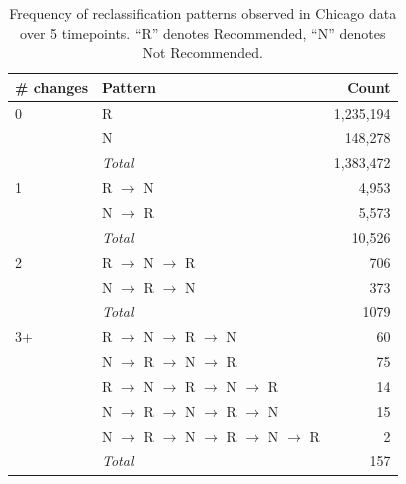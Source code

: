 
\begin{table}[t]
    \centering
    \caption{Frequency of reclassification patterns observed in Chicago data over 5 timepoints. ``R'' denotes Recommended, ``N'' denotes Not Recommended.}
    \label{tab:reclassification_patterns}
    \begin{tabular}{llr}
    \# changes & Pattern & Count \\
	 \hline
	 0 & R & 1,235,194\\
	 & N & 148,278\\
	 & \textit{Total} & 1,383,472 \\
	 \hline
	 1& R $\to$ N & 4,953\\
	 & N $\to$ R & 5,573\\
	 & \textit{Total} & 10,526\\
	 \hline
	 2& R $\to$ N $\to$ R & 706\\
	 & N $\to$ R $\to$ N & 373\\
	 & \textit{Total} & 1079\\
	 \hline
	 3+ & R $\to$ N $\to$ R $\to$ N & 60\\
	 & N $\to$ R $\to$ N $\to$ R & 75\\
	 & R $\to$ N $\to$ R $\to$ N $\to$ R & 14\\
	 & N $\to$ R $\to$ N $\to$ R $\to$ N & 15\\
	 & N $\to$ R $\to$ N $\to$ R $\to$ N $\to$ R & 2\\
	 & \textit{Total} & 157\\
	 \hline
    \end{tabular}
\end{table}

